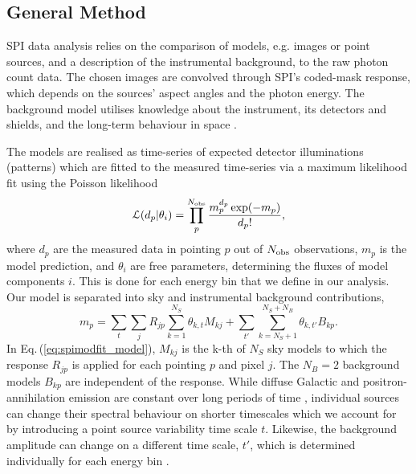 \documentclass[doublespace,draft,nopageskip]{VTthesis} %
\begin{document}
	
	\subsection{General Method}\label{sec:likelihood_analysis}
	SPI data analysis relies on the comparison of models, e.g. images or point sources, and a description of the instrumental background, to the raw photon count data.
	The chosen images are convolved through SPI's coded-mask response, which depends on the sources' aspect angles and the photon energy.
	The background model utilises knowledge about the instrument, its detectors and shields, and the long-term behaviour in space \citep{Diehl2018_BGRDB,Siegert2019_SPIBG}.
	
	The models are realised as time-series of expected detector illuminations (patterns) which are fitted to the measured time-series via a maximum likelihood fit using the Poisson likelihood
	\begin{equation}
		\mathcal{L}(d_p|\theta_i) = \prod_p^{N_{\rm obs}} \frac{m_p^{d_p} \exp(-m_p)}{d_p!}\mathrm{,}
		\label{eq:cstat}
	\end{equation}
	\noindent where $d_p$ are the measured data in pointing $p$ out of $N_{\rm obs}$ observations, $m_p$ is the model prediction, and $\theta_i$ are free parameters, determining the fluxes of model components $i$.
	This is done for each energy bin that we define in our analysis.
	Our model is separated into sky and instrumental background contributions,
	\begin{equation}
		m_p = \sum_{t} \sum_{j} R_{jp} \sum_{k=1}^{N_S} \theta_{k,t} M_{kj} + \sum_{t'} \sum_{k=N_S+1}^{N_S+N_B} \theta_{k,t'} B_{kp}\mathrm{.}
		\label{eq:spimodfit_model}
	\end{equation}
	\noindent In Eq.\,(\ref{eq:spimodfit_model}), $M_{kj}$ is the k-th of $N_S$ sky models to which the response $R_{jp}$ is applied for each pointing $p$ and pixel $j$.
	The $N_B = 2$ background models $B_{kp}$ are independent of the response.
	While diffuse Galactic and positron-annihilation emission are constant over long periods of time \citep{Purcell1997_511}, individual sources can change their spectral behaviour on shorter timescales which we account for by introducing a point source variability time scale $t$.
	Likewise, the background amplitude can change on a different time scale, $t'$, which is determined individually for each energy bin \citep{Siegert2019_SPIBG}.
	
	
	
\end{document}
